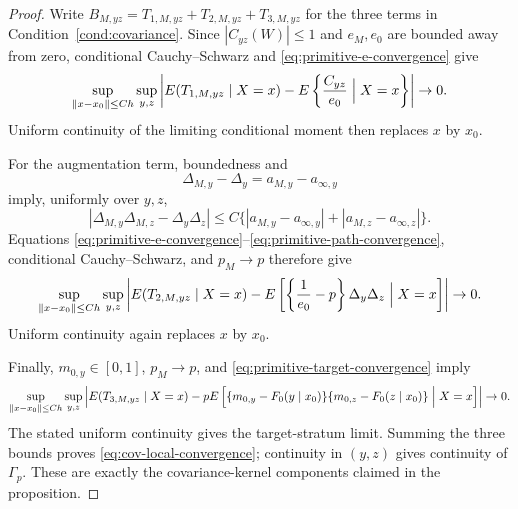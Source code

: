 \begin{proof}
Write \(B_{M,yz}=T_{1,M,yz}+T_{2,M,yz}+T_{3,M,yz}\) for the three terms in Condition~\ref{cond:covariance}. Since \(|C_{yz}(W)|\le1\) and \(e_M,e_0\) are bounded away from zero, conditional Cauchy--Schwarz and \eqref{eq:primitive-e-convergence} give
\[
\sup_{\|x-x_0\|\le Ch}\sup_{y,z}
\left|
E(T_{1,M,yz}\mid X=x)
-
E\left\{\frac{C_{yz}}{e_0}\Bigm|X=x\right\}
\right|
\to0.
\]
Uniform continuity of the limiting conditional moment then replaces \(x\) by \(x_0\).

For the augmentation term, boundedness and
\[
\Delta_{M,y}-\Delta_y
=a_{M,y}-a_{\infty,y}
\]
imply, uniformly over \(y,z\),
\[
|\Delta_{M,y}\Delta_{M,z}
 -\Delta_y\Delta_z|
\le
C\{|a_{M,y}-a_{\infty,y}|
   +|a_{M,z}-a_{\infty,z}|\}.
\]
Equations \eqref{eq:primitive-e-convergence}--\eqref{eq:primitive-path-convergence}, conditional Cauchy--Schwarz, and \(p_M\to p\) therefore give
\[
\sup_{\|x-x_0\|\le Ch}\sup_{y,z}
\left|
E(T_{2,M,yz}\mid X=x)
-
E\left[
\left\{\frac1{e_0}-p\right\}
\Delta_y\Delta_z
\Bigm|X=x
\right]
\right|
\to0.
\]
Uniform continuity again replaces \(x\) by \(x_0\).

Finally, \(m_{0,y}\in[0,1]\), \(p_M\to p\), and \eqref{eq:primitive-target-convergence} imply
\[
\sup_{\|x-x_0\|\le Ch}\sup_{y,z}
\left|
E(T_{3,M,yz}\mid X=x)
-
pE\left[
\{m_{0,y}-F_0(y\mid x_0)\}
\{m_{0,z}-F_0(z\mid x_0)\}
\Bigm|X=x
\right]
\right|
\to0.
\]
The stated uniform continuity gives the target-stratum limit. Summing the three bounds proves \eqref{eq:cov-local-convergence}; continuity in \((y,z)\) gives continuity of \(\Gamma_p\). These are exactly the covariance-kernel components claimed in the proposition.
\end{proof}
